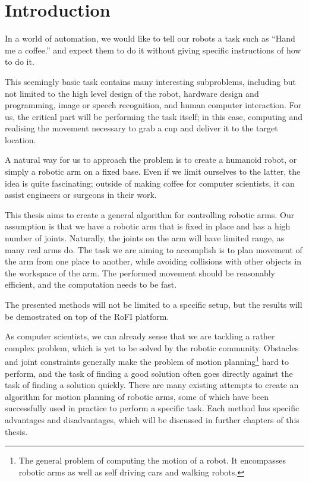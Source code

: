 \chapter{Introduction}


In a world of automation, we would like to tell our robots a task such
as \enquote{Hand me a coffee.} and expect them to do it without giving
specific instructions of how to do it.

This seemingly basic task contains many interesting subproblems, including but not limited to
the high level design of the robot, hardware design and programming, image or speech recognition, and human computer interaction.
For us, the critical part will be performing the task itself; in this case, computing and realising the movement necessary to grab a cup and deliver it to the target location.

A natural way for us to approach the problem is to create a humanoid robot, or simply a robotic arm on a fixed base. Even if we limit ourselves to the latter, the idea is quite fascinating; outside of making coffee for computer scientists, it can assist engineers or surgeons in their work.

This thesis aims to create a general algorithm for controlling robotic arms.
Our assumption is that we have a robotic arm that is fixed in place and has a high number of joints.
Naturally, the joints on the arm will have limited range, as many real arms do.
The task we are aiming to accomplish is to plan movement of the arm from one place to another, while avoiding collisions with other objects in the workspace of the arm.
The performed movement should be reasonably efficient, and the computation needs to be fast.

The presented methods will not be limited to a specific setup, but the results will be demostrated on top of the RoFI platform\cite{rofiPlatform}.

As computer scientists, we can already sense that we are tackling a rather complex problem, which is yet to be solved by the robotic community. Obstacles and joint constraints generally make the problem of motion planning\footnote{The general problem of computing the motion of a robot. It encompasses robotic arms as well as self driving cars and walking robots.} hard to perform, and the task of finding a good solution often goes directly against the task of finding a solution quickly.
There are many existing attempts to create an algorithm for motion planning of robotic arms,
some of which have been successfully used in practice to perform a specific task. Each method has specific advantages and disadvantages, which will be discussed in further chapters of this thesis.

